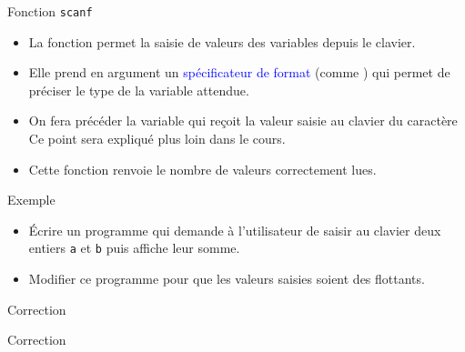 \documentclass[10pt]{beamer}
\begin{document}
\begin{frame}[fragile]{\Ctitle}{\stitle}
	\begin{block}{Fonction {\tt scanf}}
		\begin{itemize}
			\item<1-> La fonction  permet la saisie de valeurs des variables depuis le clavier.
			\item<2-> Elle prend en argument un \textcolor{blue}{spécificateur de format} (comme ) qui permet de préciser le type de la variable attendue.
			\item<3-> On fera précéder la variable qui reçoit la valeur saisie au clavier du caractère \kw{\&} \\
				\onslide<4-> Ce point sera expliqué plus loin dans le cours.
			\item<5-> Cette fonction renvoie le nombre de valeurs correctement lues.
		\end{itemize}
	\end{block}
	\begin{exampleblock}{Exemple}
		\begin{itemize}
			\item<6-> Écrire un programme qui demande à l'utilisateur de saisir au clavier deux entiers {\tt a} et {\tt b} puis affiche leur somme.
			\item<7-> Modifier ce programme pour que les valeurs saisies soient des flottants.
		\end{itemize}
	\end{exampleblock}
\end{frame}

\begin{frame}{\Ctitle}{\stitle}
	\begin{exampleblock}{Correction}
	\end{exampleblock}
\end{frame}

\begin{frame}{\Ctitle}{\stitle}
	\begin{exampleblock}{Correction}
	\end{exampleblock}
\end{frame}
\end{document}
